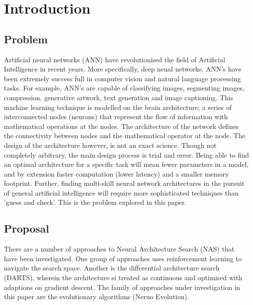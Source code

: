 
\section{Introduction}
    \label{sec:intro}

    \subsection{Problem}
    Artificial neural networks (ANN) have revolutionised the field of Artificial Intelligence in recent years. More specifically, deep neual networks. ANN's have been extremely success full in computer vision and natural language processing tasks. For example, ANN's are capable of classifying images, segmenting images, compression, generative artwork, text generation and image captioning. This machine learning technique is modelled on the brain architecture; a series of interconnected nodes (neurons) that represent the flow of information with mathematical operations at the nodes. The architecture of the network defines the connectivity between nodes and the mathematical operator at the node. The design of the architecture however, is not an exact science. Though not completely arbitrary, the main design process is trial and error. Being able to find an optimal architecture for a specific task will mean fewer parameters in a model, and by extension faster computation (lower latency) and a smaller memory footprint. Further, finding multi-skill neural network architectures in the pursuit of general artificial intelligence will require more sophisticated techniques than 'guess and check'. This is the problem explored in this paper.

    \subsection{Proposal}

There are a number of approaches to Neural Architecture Search (NAS) that have been investigated. One group of approaches uses reinforcement learning to navigate the search space. Another is the differential architecture search (DARTS), wherein the architecture si treated as continuous and optimised with adaptions on gradient descent. The family of approaches under investigation in this paper are the evolutionary algorithms (Neruo Evolution).

